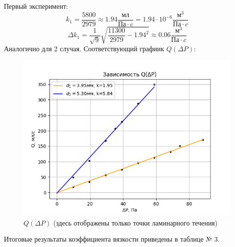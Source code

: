 \documentclass[a4paper, 10pt, twocolumn]{article}
\begin{document}
    Первый эксперимент: 
    $$k_1 = \frac{5800}{2979} \approx 1.94 \frac{\text{мл}}{\text{Па} \cdot c} = 1.94 \cdot 10^{-6} \frac{\text{м}^3}{\text{Па} \cdot c} $$
    $$\Delta k_1 = \frac{1}{\sqrt{9}}\sqrt{\frac{11300}{2979} - 1.94^2} \approx 0.06 \frac{\text{м}^3}{\text{Па} \cdot c} $$
    Аналогично для 2 случая. 
    Соответствующий графиик $Q(\Delta P)$:
    \begin{figure}[H]
        \includegraphics[width=1\linewidth]{graphs/figure1.png}
        \begin{center}
            \caption{$Q(\Delta P)$ (здесь отображены только точки ламинарного течения)}
        \end{center}
    \end{figure}
    Итоговые результаты коэффициента вязкости приведены в таблице № 3.
\end{document}

